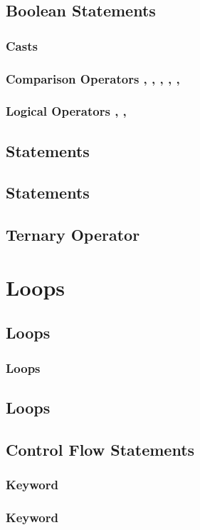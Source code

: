 \documentclass{article}
\begin{document}
\subsection{Boolean Statements}

\subsubsection{ Casts}

\subsubsection{Comparison Operators \inlinecpp{==}, \inlinecpp{!=}, \inlinecpp{<}, \inlinecpp{<=}, \inlinecpp{>}, \inlinecpp{>=}}

\subsubsection{Logical Operators \inlinecpp{!}, \inlinecpp{\&\&}, \inlinecpp{||}}

\subsection{ Statements}

\subsection{ Statements}

\subsection{Ternary Operator }

\section{Loops}

\subsection{ Loops}

\subsubsection{ Loops}

\subsection{ Loops}

\subsection{Control Flow Statements}

\subsubsection{ Keyword}

\subsubsection{ Keyword}
\end{document}
